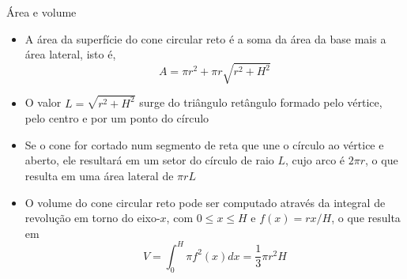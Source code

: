\begin{frame}[fragile]{Área e volume}

    \begin{itemize}
        \item A área da superfície do cone circular reto é a soma da área da base mais 
            a área lateral, isto é,
        \[
            A = \pi r^2 + \pi r\sqrt{r^2 + H^2}
        \]
        \pause

        \item O valor $L = \sqrt{r^2 + H^2}$ surge do triângulo retângulo formado pelo vértice, 
            pelo centro e por um ponto do círculo
        \pause

        \item Se o cone for cortado num segmento de reta que une o círculo ao vértice e 
            aberto, ele resultará em um setor do círculo de raio $L$, cujo arco é $2\pi r$, 
            o que resulta em uma área lateral de $\pi rL$
        \pause

        \item O volume do cone circular reto pode ser computado através da integral de
            revolução em torno do eixo-$x$, com $0 \leq x \leq H$ e $f(x) = rx/H$, o que 
            resulta em 
            \[
                V = \int_0^H \pi f^2(x) dx = \frac{1}{3}\pi r^2 H
            \]

    \end{itemize}

\end{frame}

